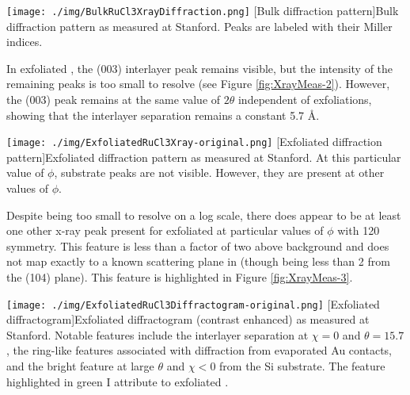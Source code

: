 \begin{centering}
\texttt{[image: ./img/BulkRuCl3XrayDiffraction.png]}
  \captionsetup{width=0.75\textwidth}
  [Bulk \rucl diffraction pattern]{Bulk \rucl diffraction pattern as measured at Stanford. Peaks are labeled with their Miller indices.} 
  \label{fig:XrayMeas-1}
\end{centering}

In exfoliated \ruclnospace , the (003) interlayer peak remains visible, but the intensity of the remaining peaks is too small to resolve (see Figure \ref{fig:XrayMeas-2}). However, the (003) peak remains at the same value of $2\theta$ independent of exfoliations, showing that the interlayer separation remains a constant 5.7 \AA .

\begin{centering}
\texttt{[image: ./img/ExfoliatedRuCl3Xray-original.png]}
  \captionsetup{width=0.75\textwidth}
  [Exfoliated \rucl diffraction pattern]{Exfoliated \rucl diffraction pattern as measured at Stanford. At this particular value of $\phi$, substrate peaks are not visible. However, they are present at other values of $\phi$.} 
  \label{fig:XrayMeas-2}
\end{centering}

Despite being too small to resolve on a log scale, there does appear to be at least one other x-ray peak present for exfoliated \rucl at particular values of $\phi$ with 120\degree{} symmetry. This feature is less than a factor of two above background and does not map exactly to a known scattering plane in \rucl (though being less than 2\degree{} from the (104) plane). This feature is highlighted in Figure \ref{fig:XrayMeas-3}.

\begin{centering}
\texttt{[image: ./img/ExfoliatedRuCl3Diffractogram-original.png]}
  \captionsetup{width=0.75\textwidth}
  [Exfoliated \rucl diffractogram]{Exfoliated \rucl diffractogram (contrast enhanced) as measured at Stanford. Notable features include the \rucl interlayer separation at $\chi = 0$ and $\theta = 15.7$\degree, the ring-like features associated with diffraction from evaporated Au contacts, and the bright feature at large $\theta$ and $\chi < 0$ from the Si substrate. The feature highlighted in green I attribute to exfoliated \ruclnospace .} 
  \label{fig:XrayMeas-3}
\end{centering}

